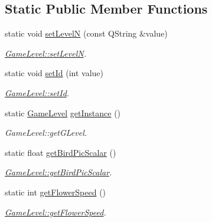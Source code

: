 \subsection*{Static Public Member Functions}
\begin{DoxyCompactItemize}
\item 
static void \hyperlink{class_game_level_aecafb8ea53d8fbc0c354db3e7b877848}{set\+Level\+N} (const Q\+String \&value)
\begin{DoxyCompactList}\small\item\em \hyperlink{class_game_level_aecafb8ea53d8fbc0c354db3e7b877848}{Game\+Level\+::set\+Level\+N}. \end{DoxyCompactList}\item 
static void \hyperlink{class_game_level_a15dbe223c7d2d2cf22bf869c44b7cc35}{set\+Id} (int value)
\begin{DoxyCompactList}\small\item\em \hyperlink{class_game_level_a15dbe223c7d2d2cf22bf869c44b7cc35}{Game\+Level\+::set\+Id}. \end{DoxyCompactList}\item 
static \hyperlink{class_game_level}{Game\+Level} \hyperlink{class_game_level_abfd8683983588ee8343b26e194d493ac}{get\+Instance} ()
\begin{DoxyCompactList}\small\item\em Game\+Level\+::get\+G\+Level. \end{DoxyCompactList}\item 
static float \hyperlink{class_game_level_a3bad525afd79aa4653538b360e5b053d}{get\+Bird\+Pic\+Scalar} ()
\begin{DoxyCompactList}\small\item\em \hyperlink{class_game_level_a3bad525afd79aa4653538b360e5b053d}{Game\+Level\+::get\+Bird\+Pic\+Scalar}. \end{DoxyCompactList}\item 
static int \hyperlink{class_game_level_a9a15dd2831a62009c270eb9d7669a9d9}{get\+Flower\+Speed} ()
\begin{DoxyCompactList}\small\item\em \hyperlink{class_game_level_a9a15dd2831a62009c270eb9d7669a9d9}{Game\+Level\+::get\+Flower\+Speed}. \end{DoxyCompactList}\end{DoxyCompactItemize}

